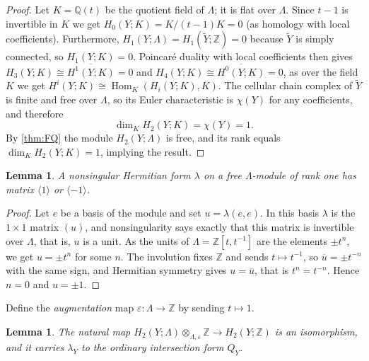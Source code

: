 \documentclass[11pt]{amsart}
\newtheorem{lemma}[theorem]{Lemma}
\theoremstyle{definition}
\theoremstyle{remark}
\newcommand{\Z}{\mathbb Z}
\newcommand{\Q}{\mathbb Q}
\begin{document}
\begin{proof}
Let $K=\Q(t)$ be the quotient field of $\Lambda$; it is flat over $\Lambda$.
Since $t-1$ is invertible in $K$ we get $H_0(Y;K)=K/(t-1)K=0$ (as homology with
local coefficients). Furthermore,
$H_1(Y;\Lambda)=H_1(\widetilde Y;\Z)=0$ because $\widetilde Y$ is simply
connected, so $H_1(Y;K)=0$.  Poincar\'e duality with local coefficients
\cite[\S3.H]{Hatcher} then gives $H_3(Y;K)\cong\overline{H^1(Y;K)}=0$ and
$H_4(Y;K)\cong\overline{H^0(Y;K)}=0$, as over the  field $K$ we get
$H^i(Y;K)\cong\operatorname{Hom}_K(H_i(Y;K),K)$.  The cellular chain complex
of $\widetilde Y$ is finite and free over $\Lambda$, so its Euler characteristic
is $\chi(Y)$ for any coefficients, and therefore
\[
 \dim_K H_2(Y;K)=\chi(Y)=1 .
\]
By \cref{thm:FQ} the module $H_2(Y;\Lambda)$ is free, and its rank equals
$\dim_K H_2(Y;K)=1$, implying the result.
\end{proof}

\begin{lemma}\label{lem:rank-one-forms}
A nonsingular Hermitian form $\lambda$ on a free $\Lambda$-module of rank one
has matrix $\langle 1\rangle $ or $\langle -1\rangle $.
\end{lemma}

\begin{proof}
Let $e$ be a basis of the module and set $u=\lambda(e,e)$.  In this basis
$\lambda$ is the $1\times1$ matrix $(u)$, and nonsingularity says exactly
that this matrix is invertible over $\Lambda$, that is, $u$ is a unit.
As the units of $\Lambda=\Z[t,t^{-1}]$ are the elements $\pm t^n$, we
get $u=\pm t^n$ for some $n$.  The involution fixes $\Z$ and sends
$t\mapsto t^{-1}$, so $\overline u=\pm t^{-n}$ with the same sign, and
Hermitian symmetry gives $u=\overline u$, that is $t^n=t^{-n}$.  Hence
$n=0$ and $u=\pm1$.
\end{proof}
Define the \emph{augmentation} map $\varepsilon\colon \Lambda\to\Z$ by
sending $t\mapsto1$.

\begin{lemma}\label{lem:augmentation}
  The natural map
  $H_2(Y;\Lambda)\otimes_{\Lambda,\varepsilon}\Z\to H_2(Y;\Z)$ is an
  isomorphism, and it carries $\lambda_Y$ to the ordinary intersection
  form $Q_Y$.
\end{lemma}
\end{document}
